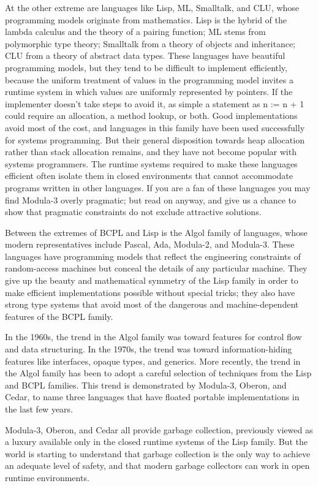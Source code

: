 \documentclass[10pt]{article}
\begin{document}
At the other extreme are languages like Lisp, ML, Smalltalk, and CLU, whose
programming models originate from mathematics.  Lisp is the hybrid of the
lambda calculus and the theory of a pairing function; ML stems from
polymorphic type theory; Smalltalk from a theory of objects and inheritance;
CLU from a theory of abstract data types.  These languages have beautiful
programming models, but they tend to be difficult to implement efficiently,
because the uniform treatment of values in the programming model invites a
runtime system in which values are uniformly represented by pointers.  If the
implementer doesn't take steps to avoid it, as simple a statement as n := n +
1 could require an allocation, a method lookup, or both.  Good implementations
avoid most of the cost, and languages in this family have been used
successfully for systems programming.  But their general disposition towards
heap allocation rather than stack allocation remains, and they have not become
popular with systems programmers.  The runtime systems required to make these
languages efficient often isolate them in closed environments that cannot
accommodate programs written in other languages.  If you are a fan of these
languages you may find Modula-3 overly pragmatic; but read on anyway, and give
us a chance to show that pragmatic constraints do not exclude attractive
solutions.

Between the extremes of BCPL and Lisp is the Algol family of languages, whose
modern representatives include Pascal, Ada, Modula-2, and Modula-3.  These
languages have programming models that reflect the engineering constraints of
random-access machines but conceal the details of any particular machine.  They
give up the beauty and mathematical symmetry of the Lisp family in order to
make efficient implementations possible without special tricks; they also have
strong type systems that avoid most of the dangerous and machine-dependent
features of the BCPL family.

In the 1960s, the trend in the Algol family was toward features for control
flow and data structuring.  In the 1970s, the trend was toward
information-hiding features like interfaces, opaque types, and generics.  More
recently, the trend in the Algol family has been to adopt a careful selection
of techniques from the Lisp and BCPL families.  This trend is demonstrated by
Modula-3, Oberon, and Cedar, to name three languages that have floated
portable implementations in the last few years.

Modula-3, Oberon, and Cedar all provide garbage collection, previously viewed
as a luxury available only in the closed runtime systems of the Lisp
family.  But the world is starting to understand that garbage collection is the
only way to achieve an adequate level of safety, and that modern garbage
collectors can work in open runtime environments.
\end{document}
